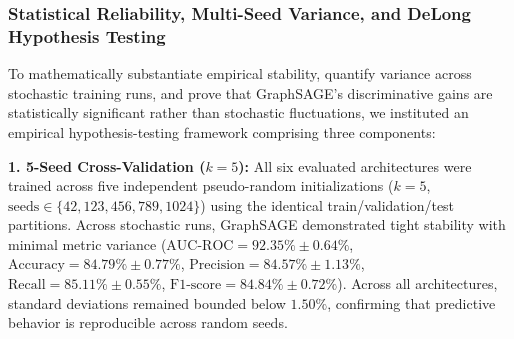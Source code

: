\documentclass[conference,a4paper]{IEEEtran}
\begin{document}
\subsubsection{Statistical Reliability, Multi-Seed Variance, and DeLong Hypothesis Testing}
To mathematically substantiate empirical stability, quantify variance across stochastic training runs, and prove that GraphSAGE's discriminative gains are statistically significant rather than stochastic fluctuations, we instituted an empirical hypothesis-testing framework comprising three components:

\textbf{1. 5-Seed Cross-Validation ($k=5$):} All six evaluated architectures were trained across five independent pseudo-random initializations ($k=5$, $\text{seeds} \in \{42, 123, 456, 789, 1024\}$) using the identical train/validation/test partitions. Across stochastic runs, GraphSAGE demonstrated tight stability with minimal metric variance ($\text{AUC-ROC} = 92.35\% \pm 0.64\%$, $\text{Accuracy} = 84.79\% \pm 0.77\%$, $\text{Precision} = 84.57\% \pm 1.13\%$, $\text{Recall} = 85.11\% \pm 0.55\%$, $\text{F1-score} = 84.84\% \pm 0.72\%$). Across all architectures, standard deviations remained bounded below $1.50\%$, confirming that predictive behavior is reproducible across random seeds.
\end{document}
